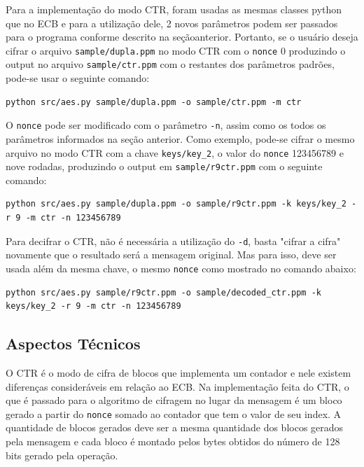 \documentclass[12pt]{article}
\begin{document}
Para a implementação do modo CTR, foram usadas as mesmas classes python que no ECB e para a utilização dele, 2 novos parâmetros podem ser passados para o programa conforme descrito na seçãoanterior. Portanto, se o usuário deseja cifrar o arquivo \texttt{sample/dupla.ppm} no modo CTR com o \texttt{nonce} 0 produzindo o output no arquivo \texttt{sample/ctr.ppm} com o restantes dos parâmetros padrões, pode-se usar o seguinte comando:

\begin{lstlisting}
python src/aes.py sample/dupla.ppm -o sample/ctr.ppm -m ctr
\end{lstlisting}

O \texttt{nonce} pode ser modificado com o parâmetro \texttt{-n}, assim como os todos os parâmetros informados na seção anterior. Como exemplo, pode-se cifrar o mesmo arquivo no modo CTR com a chave \texttt{keys/key\_2}, o valor do \texttt{nonce} 123456789 e nove rodadas, produzindo o output em \texttt{sample/r9ctr.ppm} com o seguinte comando:

\begin{lstlisting}
python src/aes.py sample/dupla.ppm -o sample/r9ctr.ppm -k keys/key_2 -r 9 -m ctr -n 123456789
\end{lstlisting}

Para decifrar o CTR, não é necessária a utilização do \texttt{-d}, basta "cifrar a cifra" novamente que o resultado será a mensagem original. Mas para isso, deve ser usada além da mesma chave, o mesmo \texttt{nonce} como mostrado no comando abaixo:

\begin{lstlisting}
python src/aes.py sample/r9ctr.ppm -o sample/decoded_ctr.ppm -k keys/key_2 -r 9 -m ctr -n 123456789
\end{lstlisting}

\subsection{Aspectos Técnicos}

O CTR é o modo de cifra de blocos que implementa um contador e nele existem diferenças consideráveis em relação ao ECB. Na implementação feita do CTR, o que é passado para o algoritmo de cifragem no lugar da mensagem é um bloco gerado a partir do \texttt{nonce} somado ao contador que tem o valor de seu index. A quantidade de blocos gerados deve ser a mesma quantidade dos blocos gerados pela mensagem e cada bloco é montado pelos bytes obtidos do número de 128 bits gerado pela operação.
\end{document}
